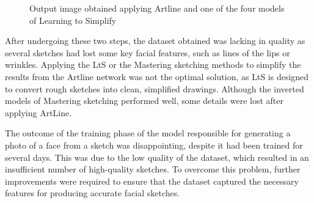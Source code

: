 \begin{figure}[htbp]
    \caption{Output image obtained applying Artline and one of the four models of Learning to Simplify}
    \label{fig:simplifyModelsRes}
\end{figure}

\noindent After undergoing these two steps, the dataset obtained was lacking in quality as several sketches had lost some key facial features, such as lines of the lips or wrinkles. Applying the LtS or the Mastering sketching methods to simplify the results from the Artline network was not the optimal solution, as LtS is designed to convert rough sketches into clean, simplified drawings. Although the inverted models of Mastering sketching performed well, some details were lost after applying ArtLine.

\noindent The outcome of the training phase of the model responsible for generating a photo of a face from a sketch was disappointing, despite it had been trained for several days. This was due to the low quality of the dataset, which resulted in an insufficient number of high-quality sketches. To overcome this problem, further improvements were required to ensure that the dataset captured the necessary features for producing accurate facial sketches.

